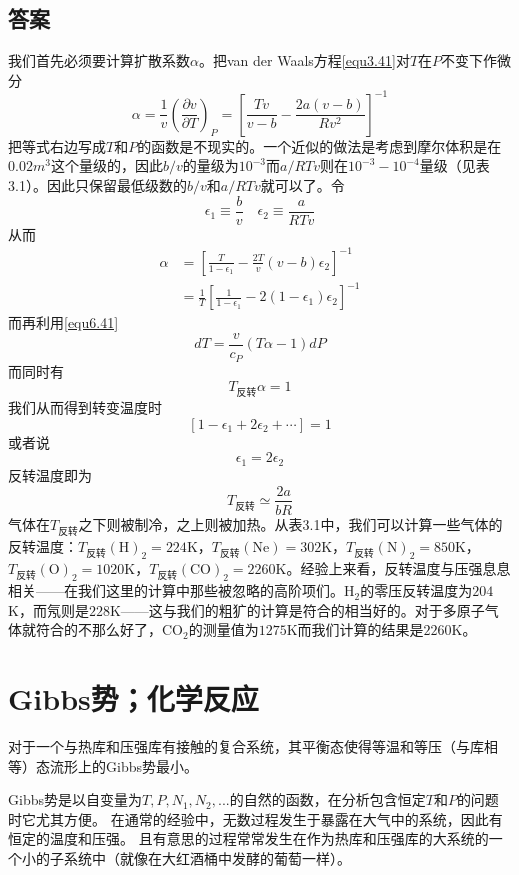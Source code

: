 \subsection*{答案}
我们首先必须要计算扩散系数$\alpha$。把van der Waals方程\eqref{equ3.41}对$T$在$P$不变下作微分
\[\alpha = \frac{1}{v}\left(\frac{\partial v}{\partial T}\right)_P=\left[\frac{Tv}{v-b}-\frac{2a(v-b)}{Rv^2}\right]^{-1} \]
把等式右边写成$T$和$P$的函数是不现实的。一个近似的做法是考虑到摩尔体积是在$0.02m^3$这个量级的，因此$b/v$的量级为$10^{-3}$而$a/RTv$则在$10^{-3}-10^{-4}$量级（见表3.1）。因此只保留最低级数的$b/v$和$a/RTv$就可以了。令
\[\epsilon_1\equiv\frac{b}{v}\quad \epsilon_2\equiv\frac{a}{RTv} \]
从而
\[\begin{split}
\alpha&=\left[\frac{T}{1-\epsilon_1}-\frac{2T}{v}(v-b)\epsilon_2\right]^{-1}\\
&=\frac{1}{T}\left[\frac{1}{1-\epsilon_1}-2(1-\epsilon_1)\epsilon_2\right]^{-1}
\end{split} \]
而再利用\eqref{equ6.41}
\[dT=\frac{v}{c_P}(T\alpha-1)dP \]
而同时有
\[T_{\text{反转}}\alpha=1 \]
我们从而得到转变温度时
\[[1-\epsilon_1+2\epsilon_2+\cdots]=1 \]
或者说
\[\epsilon_1=2\epsilon_2 \]
反转温度即为
\[T_{\text{反转}}\simeq\frac{2a}{bR} \]
气体在$T_{\text{反转}}$之下则被制冷，之上则被加热。从表3.1中，我们可以计算一些气体的反转温度：$T_{\text{反转}}(\mathrm{H})_2=224$K，$T_{\text{反转}}(\mathrm{Ne})=302$K，$T_{\text{反转}}(\mathrm{N})_2=850$K，$T_{\text{反转}}(\mathrm{O})_2=1020$K，$T_{\text{反转}}(\mathrm{CO})_2=2260$K。经验上来看，反转温度与压强息息相关——在我们这里的计算中那些被忽略的高阶项们。H$_2$的零压反转温度为$204$K，而氖则是$228$K——这与我们的粗犷的计算是符合的相当好的。对于多原子气体就符合的不那么好了，CO$_2$的测量值为$1275$K而我们计算的结果是$2260$K。



\section{Gibbs势；化学反应}
\label{sec6.4}

对于一个与热库和压强库有接触的复合系统，其平衡态使得等温和等压（与库相等）态流形上的Gibbs势最小。

Gibbs势是以自变量为$T, P, N_1, N_2, ...$的自然的函数，在分析包含恒定$T$和$P$的问题时它尤其方便。
在通常的经验中，无数过程发生于暴露在大气中的系统，因此有恒定的温度和压强。
且有意思的过程常常发生在作为热库和压强库的大系统的一个小的子系统中（就像在大红酒桶中发酵的葡萄一样）。

